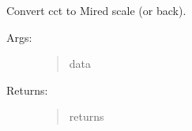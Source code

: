 \documentclass[letterpaper,10pt,english]{sphinxmanual}
\begin{document}
\begin{fulllineitems}
\label{\detokenize{color:luxpy.color.cct.cct_to_mired}}
Convert cct to Mired scale (or back).
\begin{description}
\item[{Args:}] \leavevmode\begin{quote}\begin{description}
\item[{data}] \leavevmode
{}

\end{description}\end{quote}

\item[{Returns:}] \leavevmode\begin{quote}\begin{description}
\item[{returns}] \leavevmode
{}

\end{description}\end{quote}

\end{description}

\end{fulllineitems}

\end{document}
